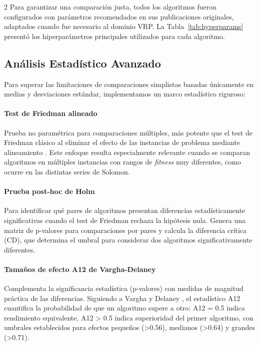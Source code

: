 \documentclass[10pt,a4paper]{extarticle}
\begin{document}
\begin{table}[!htbp]
\begin{multicols}{2}
Para garantizar una comparación justa, todos los algoritmos fueron configurados con parámetros recomendados en sus publicaciones originales, adaptados cuando fue necesario al dominio VRP. La Tabla~\ref{tab:hyperparams} presentó los hiperparámetros principales utilizados para cada algoritmo.

\subsection{Análisis Estadístico Avanzado}
Para superar las limitaciones de comparaciones simplistas basadas únicamente en medias y desviaciones estándar, implementamos un marco estadístico riguroso:

\paragraph{Test de Friedman alineado} Prueba no paramétrica para comparaciones múltiples, más potente que el test de Friedman clásico al eliminar el efecto de las instancias de problema mediante alineamiento \cite{Li2020SMA}. Este enfoque resulta especialmente relevante cuando se comparan algoritmos en múltiples instancias con rangos de \textit{fitness} muy diferentes, como ocurre en las distintas series de Solomon.

\paragraph{Prueba post-hoc de Holm} Para identificar qué pares de algoritmos presentan diferencias estadísticamente significativas cuando el test de Friedman rechaza la hipótesis nula. Genera una matriz de p-valores para comparaciones por pares y calcula la diferencia crítica (CD), que determina el umbral para considerar dos algoritmos significativamente diferentes.

\paragraph{Tamaños de efecto A12 de Vargha-Delaney} Complementa la significancia estadística (p-valores) con medidas de magnitud práctica de las diferencias. Siguiendo a Vargha y Delaney \cite{Vargha2000}, el estadístico A12 cuantifica la probabilidad de que un algoritmo supere a otro: A12 = 0.5 indica rendimiento equivalente, A12 > 0.5 indica superioridad del primer algoritmo, con umbrales establecidos para efectos pequeños (>0.56), medianos (>0.64) y grandes (>0.71).


\end{multicols}
\end{table}
\end{document}
